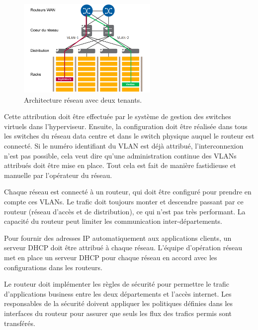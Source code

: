 \begin{figure}[h]
\begin{center}
\includegraphics[width=0.6\textwidth]{images/AspecMultiTenant_T} 
\caption{Architecture réseau avec deux tenants. \cite{leveragingSDNCloudNetworkServiceExample}} \label{AspecMultiTenant}
\end{center}
\end{figure} 

Cette attribution doit être effectuée par le système de gestion des switches virtuels dans l'hyperviseur. Ensuite, la configuration doit être réalisée dans tous les switches du réseau data centre et dans le switch physique auquel le routeur est connecté. Si le numéro identifiant du VLAN est déjà attribué, l'interconnexion n'est pas possible, cela veut dire qu'une administration continue des VLANs attribués doit être mise en place. Tout cela est fait de manière fastidieuse et manuelle par l'opérateur du réseau.

Chaque réseau est connecté à un routeur, qui doit être configuré pour prendre en compte ces VLANs. Le trafic doit toujours monter et descendre passant par ce routeur (réseau d'accès et de distribution), ce qui n'est pas très performant. La capacité du routeur peut limiter les communication inter-départements. 

Pour fournir des adresses IP automatiquement aux applications clients, un serveur DHCP doit être attribué à chaque réseau. L'équipe d'opération réseau met en place un serveur DHCP pour chaque réseau en accord avec les configurations dans les routeurs.

Le routeur doit implémenter les règles de sécurité pour permettre le trafic d'applications business entre les deux départements et l'accès internet. Les responsables de la sécurité doivent appliquer les politiques définies dans les interfaces du routeur pour assurer que seuls les flux des trafics permis sont transférés.

